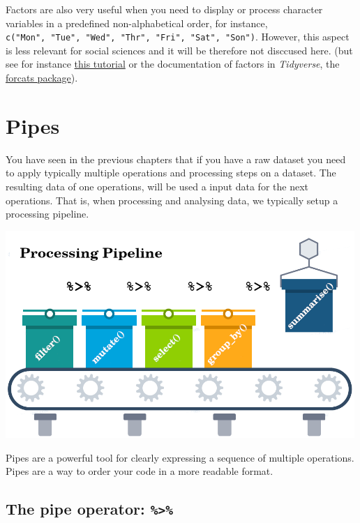 \documentclass[
]{scrartcl}
\makeatletter
\newenvironment{kframe}{%
\medskip{}
\setlength{\fboxsep}{.8em}
 \def\at@end@of@kframe{}%
 \ifinner\ifhmode%
  \def\at@end@of@kframe{\end{minipage}}%
  \begin{minipage}{\columnwidth}%
 \fi\fi%
 \def\FrameCommand##1{\hskip\@totalleftmargin \hskip-\fboxsep
 \colorbox{shadecolor}{##1}\hskip-\fboxsep
     \hskip-\linewidth \hskip-\@totalleftmargin \hskip\columnwidth}%
 \MakeFramed {\advance\hsize-\width
   \@totalleftmargin\z@ \linewidth\hsize
   \@setminipage}}%
 {\par\unskip\endMakeFramed%
 \at@end@of@kframe}
\newenvironment{rmdblock}[1]
  {
  \begin{itemize}
  \renewcommand{\labelitemi}{
    \raisebox{-.7\height}[0pt][0pt]{
      {\setkeys{Gin}{width=3em,keepaspectratio}\texttt{[image: images/\#1]}}
    }
  }
  \setlength{\fboxsep}{1em}
  \begin{kframe}
  \item
  }
  {
  \end{kframe}
  \end{itemize}
  }
\newenvironment{geek}
    {\begin{rmdblock}{geek}}
    {\end{rmdblock}}
\makeatother
\begin{document}
\begin{geek}
Factors are also very useful when you need to display or process
character variables in a predefined non-alphabetical order, for
instance,
\texttt{c("Mon",\ "Tue",\ "Wed",\ "Thr",\ "Fri",\ "Sat",\ "Son")}.
However, this aspect is less relevant for social sciences and it will be
therefore not disccused here. (but see for instance
\href{https://r4ds.had.co.nz/factors.html\#introduction-9}{this
tutorial} or the documentation of factors in \emph{Tidyverse}, the
\href{https://forcats.tidyverse.org/}{forcats package}).
\end{geek}

\section{Pipes}\label{pipes}

You have seen in the previous chapters that if you have a raw dataset you need to apply typically multiple operations and processing steps on a dataset. The resulting data of one operations, will be used a input data for the next operations. That is, when processing and analysing data, we typically setup a processing pipeline.

\begin{center}\includegraphics[width=500px]{images/pipeline} \end{center}

Pipes are a powerful tool for clearly expressing a sequence of multiple operations. Pipes are a way to order your code in a more readable format.

\subsection{\texorpdfstring{The pipe operator: \texttt{\%\textgreater{}\%}}{The pipe operator: \%\textgreater\%}}\label{the-pipe-operator}
\end{document}
